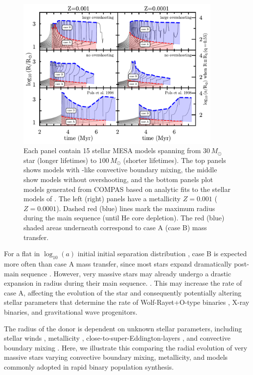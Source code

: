 \documentclass[twocolumn]{aastex63}
\begin{document}
\begin{figure}[htbp]
  \centering
  \includegraphics[width=0.9\textwidth]{radii}
  \caption{Each panel contain 15 stellar \textsc{MESA} models spanning
    from $30 \, M_{\odot}$ star (longer lifetimes) to
    $100 \, M_{\odot}$ (shorter lifetimes). The top panels shows
    models with \cite{brott:11}-like convective boundary mixing, the
    middle show models without overshooting, and the bottom panels
    plot models generated from \textsc{COMPAS} based on analytic fits
    to the stellar models of \cite{pols:98}. The left (right) panels
    have a metallicity $Z=0.001$ ($Z=0.0001$). Dashed red (blue) lines
    mark the maximum radius during the main sequence (until He core
    depletion). The red (blue) shaded areas underneath correspond to
    case A (case B) mass transfer.}
  \label{fig:radii}
\end{figure}


For a flat in $\log_{10}(a)$ initial initial separation distribution
\citep{opik:24}, case B is expected more often than case A mass
transfer, since most stars expand dramatically post-main sequence
\citep{vandenheuvel:69}. However, very massive stars may already
undergo a drastic expansion in radius during their main sequence.
\citep[e.g.,][]{sanyal:15, jiang:15, sabhahit:24}. This may increase
the rate of case A, affecting the evolution of the star and
consequently potentially altering stellar parameters that determine
the rate of Wolf-Rayet+O-type binaries \citep[e.g.,][]{nuijten:24},
X-ray binaries, and gravitational wave progenitors.

The radius of the
donor is dependent on unknown stellar parameters, including stellar
winds \citep{renzo:17, josiek:24}, metallicity \citep{xin:22},
close-to-super-Eddington-layers \citep[e.g.,][]{joss:73, paxton:13,
  jiang:15, agrawal:22, jermyn:23}, and convective boundary mixing
\citep{anders:23, johnston:24}. Here, we illustrate this comparing the
radial evolution of very massive stars varying convective boundary
mixing, metallicity, and models commonly adopted in rapid binary
population synthesis.
\end{document}
